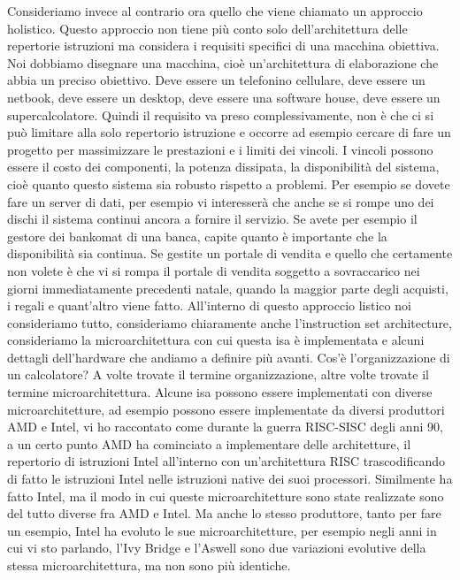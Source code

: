 Consideriamo invece al contrario ora quello che viene chiamato un approccio holistico.
Questo approccio non tiene più conto solo dell'architettura delle repertorie istruzioni ma considera i requisiti specifici di una macchina obiettiva.
Noi dobbiamo disegnare una macchina, cioè un'architettura di elaborazione che abbia un preciso obiettivo.
Deve essere un telefonino cellulare, deve essere un netbook, deve essere un desktop, deve essere una software house, deve essere un supercalcolatore.
Quindi il requisito va preso complessivamente, non è che ci si può limitare alla solo repertorio istruzione e occorre ad esempio cercare di fare un progetto per massimizzare le prestazioni e i limiti dei vincoli.
I vincoli possono essere il costo dei componenti, la potenza dissipata, la disponibilità del sistema, cioè quanto questo sistema sia robusto rispetto a problemi.
Per esempio se dovete fare un server di dati, per esempio vi interesserà che anche se si rompe uno dei dischi il sistema continui ancora a fornire il servizio.
Se avete per esempio il gestore dei bankomat di una banca, capite quanto è importante che la disponibilità sia continua.
Se gestite un portale di vendita e quello che certamente non volete è che vi si rompa il portale di vendita soggetto a sovraccarico nei giorni immediatamente precedenti natale, quando la maggior parte degli acquisti, i regali e quant'altro viene fatto.
All'interno di questo approccio listico noi consideriamo tutto, consideriamo chiaramente anche l'instruction set architecture, consideriamo la microarchitettura con cui questa isa è implementata e alcuni dettagli dell'hardware che andiamo a definire più avanti.
Cos'è l'organizzazione di un calcolatore?
A volte trovate il termine organizzazione, altre volte trovate il termine microarchitettura.
Alcune isa possono essere implementati con diverse microarchitetture, ad esempio possono essere implementate da diversi produttori AMD e Intel, vi ho raccontato come durante la guerra RISC-SISC degli anni 90, a un certo punto AMD ha cominciato a implementare delle architetture, il repertorio di istruzioni Intel all'interno con un'architettura RISC trascodificando di fatto le istruzioni Intel nelle istruzioni native dei suoi processori.
Similmente ha fatto Intel, ma il modo in cui queste microarchitetture sono state realizzate sono del tutto diverse fra AMD e Intel.
Ma anche lo stesso produttore, tanto per fare un esempio, Intel ha evoluto le sue microarchitetture, per esempio negli anni in cui vi sto parlando, l'Ivy Bridge e l'Aswell sono due variazioni evolutive della stessa microarchitettura, ma non sono più identiche.
